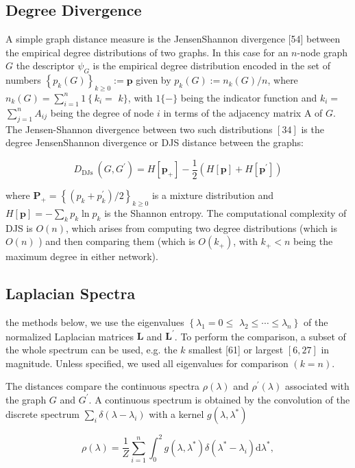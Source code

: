 \subsection{Degree Divergence}
A simple graph distance measure is the JensenShannon divergence [54] between the empirical degree distributions of two graphs. In this case for an $n$-node graph $G$ the descriptor $\psi_{G}$ is the empirical degree distribution encoded in the set of numbers $\left\{p_{k}(G)\right\}_{k \geq 0}:=\mathbf{p}$ given by $p_{k}(G):=n_{k}(G) / n$, where $n_{k}(G)=\sum_{i=1}^{n} 1\left\{k_{i}=\right.$ $k\}$, with $1\{-\}$ being the indicator function and $k_{i}=$ $\sum_{j=1}^{n} A_{i j}$ being the degree of node $i$ in terms of the adjacency matrix A of $G$. The Jensen-Shannon divergence between two such distributions $[34]$ is the degree JensenShannon divergence or DJS distance between the graphs:

$$
D_{\text {DJs }}\left(G, G^{\prime}\right)=H\left[\mathbf{p}_{+}\right]-\frac{1}{2}\left(H[\mathbf{p}]+H\left[\mathbf{p}^{\prime}\right]\right)
$$

where $\mathbf{P}_{+}=\left\{\left(p_{k}+p_{k}^{\prime}\right) / 2\right\}_{k \geq 0}$ is a mixture distribution and $H[\mathbf{p}]=-\sum_{k} p_{k} \ln p_{k}$ is the Shannon entropy. The computational complexity of DJS is $O(n)$, which arises from computing two degree distributions (which is $O(n)$ ) and then comparing them (which is $O\left(k_{+}\right)$, with $k_{+}<n$ being the maximum degree in either network).

\subsection{Laplacian Spectra}
the methods below, we use the eigenvalues $\left\{\lambda_{1}=0 \leq\right.$ $\left.\lambda_{2} \leq \cdots \leq \lambda_{n}\right\}$ of the normalized Laplacian matrices $\mathbf{L}$ and $\mathbf{L}^{\prime}$. To perform the comparison, a subset of the whole spectrum can be used, e.g. the $k$ smallest [61] or largest $[6,27]$ in magnitude. Unless specified, we used all eigenvalues for comparison $(k=n)$.

The distances compare the continuous spectra $\rho(\lambda)$ and $\rho^{\prime}(\lambda)$ associated with the graph $G$ and $G^{\prime}$. A continuous spectrum is obtained by the convolution of the discrete spectrum $\sum_{i} \delta\left(\lambda-\lambda_{i}\right)$ with a kernel $g\left(\lambda, \lambda^{*}\right)$

$$
\rho(\lambda)=\frac{1}{Z} \sum_{i=1}^{n} \int_{0}^{2} g\left(\lambda, \lambda^{*}\right) \delta\left(\lambda^{*}-\lambda_{i}\right) \mathrm{d} \lambda^{*},
$$

